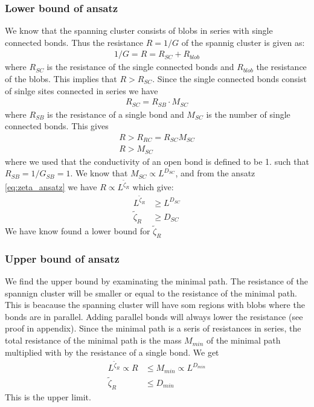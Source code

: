 \documentclass[reprint, amsmath, amssymb, aps]{revtex4-2}
\newcommand{\zetaR}{\tilde{\zeta}_R}
\begin{document}
\subsubsection{Lower bound of ansatz}
We know that the spanning cluster consists of blobs in series with single connected bonds. Thus the resistance $R = 1/G$ of the spannig cluster is given as:
\begin{align*}
  1/G = R = R_{SC} + R_{blob}
\end{align*}
where $R_{SC}$ is the resistance of the single connected bonds and $R_{blob}$ the resistance of the blobs. This implies that $R > R_{SC}$. Since the single connected bonds consist of sinlge sites connected in series we have
\begin{align*}
  R_{SC} = R_{SB}\cdot M_{SC}
\end{align*}
where $R_{SB}$ is the resistance of a single bond and $M_{SC}$ is the number of single connected bonds. This gives
\begin{align*}
  R > R_{RC} = R_{SC}M_{SC} \\
  R > M_{SC}
\end{align*}
where we used that the conductivity of an open bond is defined to be 1. such that $R_{SB} = 1/G_{SB} = 1$. We know that $M_{SC} \propto L^{D_{SC}}$, and from the ansatz \ref{eq:zeta_ansatz} we have $R \propto L^{\zetaR}$ which give:
\begin{align*}
  L^{\zetaR} &\ge L^{D_{SC}}  \\
   \zetaR &\ge D_{SC}
\end{align*}
We have know found a lower bound for $\zetaR$

\subsubsection{Upper bound of ansatz}
We find the upper bound by examinating the minimal path. The resistance of the spannign cluster will be smaller or equal to the resistance of the minimal path. This is beacause the spanning cluster will have som regions with blobs where the bonds are in parallel. Adding parallel bonds will always lower the resistance (see proof in appendix). Since the minimal path is a seris of resistances in series, the total resistance of the minimal path is the mass $M_{min}$ of the minimal path multiplied with by the resistance of a single bond. We get
\begin{align*}
  L^{\zetaR} \propto R &\le M_{min} \propto L^{D_{min}} \\
  \zetaR &\le D_{min}
\end{align*}
This is the upper limit.
\end{document}

